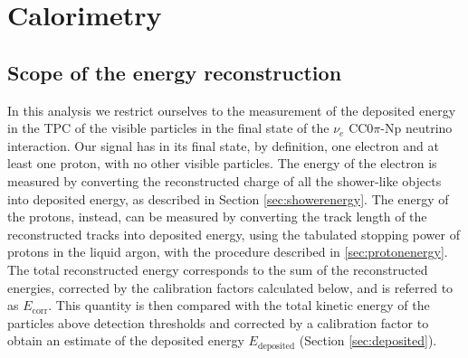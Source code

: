 
\section{Calorimetry}\label{sec:energyreco}
\subsection{Scope of the energy reconstruction}
In this analysis we restrict ourselves to the measurement of the deposited energy in the TPC of the visible particles in the final state of the $\nu_e$ CC0$\pi$-Np neutrino interaction. Our signal has in its final state, by definition, one electron and at least one proton, with no other visible particles. The energy of the electron is measured by converting the reconstructed charge of all the shower-like objects into deposited energy, as described in Section \ref{sec:showerenergy}. The energy of the protons, instead, can be measured by converting the track length of the reconstructed tracks into deposited energy, using the tabulated stopping power of protons in the liquid argon, with the procedure described in \ref{sec:protonenergy}. The total reconstructed energy corresponds to the sum of the reconstructed energies, corrected by the calibration factors calculated below, and is referred to as $E_{\mathrm{corr}}$. This quantity is then compared with the total kinetic energy of the particles above detection thresholds and corrected by a calibration factor to obtain an estimate of the deposited energy $E_{\mathrm{deposited}}$ (Section \ref{sec:deposited}).


